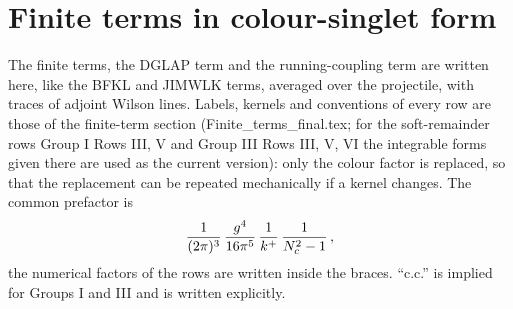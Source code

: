 \section{Finite terms in colour-singlet form}\label{sec:singlet}
\noindent The finite terms, the DGLAP term and the running-coupling term are written here, like the BFKL and JIMWLK terms, averaged over the projectile, with traces of adjoint Wilson lines. Labels, kernels and conventions of every row are those of the finite-term section (Finite\_terms\_final.tex; for the soft-remainder rows Group I Rows III, V and Group III Rows III, V, VI the integrable forms given there are used as the current version): only the colour factor is replaced, so that the replacement can be repeated mechanically if a kernel changes. The common prefactor is
\begin{align}
\frac{1}{(2\pi)^{3}}\,\frac{g^{4}}{16\pi^{5}}\,\frac{1}{k^{+}}\,\frac{1}{N_{c}^{2}-1}\,,\notag
\end{align}
the numerical factors of the rows are written inside the braces. ``c.c.'' is implied for Groups I and III and is written explicitly.

